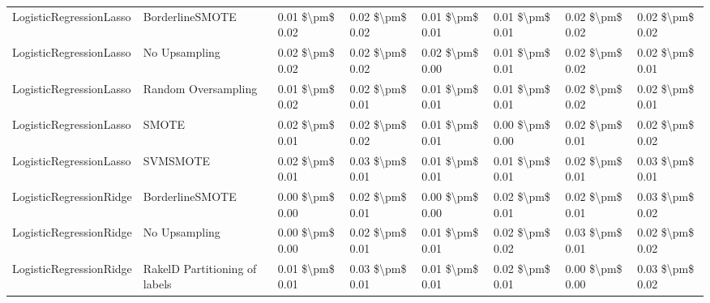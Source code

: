 \begin{tabular}{llllllll}
        LogisticRegressionLasso &               BorderlineSMOTE & 0.01 \$\textbackslash pm\$ 0.02 &           0.02 \$\textbackslash pm\$ 0.02 &       0.01 \$\textbackslash pm\$ 0.01 &        0.01 \$\textbackslash pm\$ 0.01 &                         0.02 \$\textbackslash pm\$ 0.02 & 0.02 \$\textbackslash pm\$ 0.02 \\
        LogisticRegressionLasso &                 No Upsampling & 0.02 \$\textbackslash pm\$ 0.02 &           0.02 \$\textbackslash pm\$ 0.02 &       0.02 \$\textbackslash pm\$ 0.00 &        0.01 \$\textbackslash pm\$ 0.01 &                         0.02 \$\textbackslash pm\$ 0.02 & 0.02 \$\textbackslash pm\$ 0.01 \\
        LogisticRegressionLasso &           Random Oversampling & 0.01 \$\textbackslash pm\$ 0.02 &           0.02 \$\textbackslash pm\$ 0.01 &       0.01 \$\textbackslash pm\$ 0.01 &        0.01 \$\textbackslash pm\$ 0.01 &                         0.02 \$\textbackslash pm\$ 0.02 & 0.02 \$\textbackslash pm\$ 0.01 \\
        LogisticRegressionLasso &                         SMOTE & 0.02 \$\textbackslash pm\$ 0.01 &           0.02 \$\textbackslash pm\$ 0.02 &       0.01 \$\textbackslash pm\$ 0.01 &        0.00 \$\textbackslash pm\$ 0.00 &                         0.02 \$\textbackslash pm\$ 0.01 & 0.02 \$\textbackslash pm\$ 0.02 \\
        LogisticRegressionLasso &                      SVMSMOTE & 0.02 \$\textbackslash pm\$ 0.01 &           0.03 \$\textbackslash pm\$ 0.01 &       0.01 \$\textbackslash pm\$ 0.01 &        0.01 \$\textbackslash pm\$ 0.01 &                         0.02 \$\textbackslash pm\$ 0.01 & 0.03 \$\textbackslash pm\$ 0.01 \\
        LogisticRegressionRidge &               BorderlineSMOTE & 0.00 \$\textbackslash pm\$ 0.00 &           0.02 \$\textbackslash pm\$ 0.01 &       0.00 \$\textbackslash pm\$ 0.00 &        0.02 \$\textbackslash pm\$ 0.01 &                         0.02 \$\textbackslash pm\$ 0.01 & 0.03 \$\textbackslash pm\$ 0.02 \\
        LogisticRegressionRidge &                 No Upsampling & 0.00 \$\textbackslash pm\$ 0.00 &           0.02 \$\textbackslash pm\$ 0.01 &       0.01 \$\textbackslash pm\$ 0.01 &        0.02 \$\textbackslash pm\$ 0.02 &                         0.03 \$\textbackslash pm\$ 0.01 & 0.02 \$\textbackslash pm\$ 0.02 \\
        LogisticRegressionRidge & RakelD Partitioning of labels & 0.01 \$\textbackslash pm\$ 0.01 &           0.03 \$\textbackslash pm\$ 0.01 &       0.01 \$\textbackslash pm\$ 0.01 &        0.02 \$\textbackslash pm\$ 0.01 &                         0.00 \$\textbackslash pm\$ 0.00 & 0.03 \$\textbackslash pm\$ 0.02 \\

\end{tabular}
